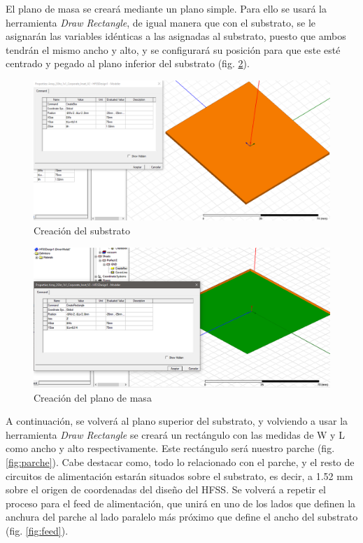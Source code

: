 \par El plano de masa se creará mediante un plano simple. Para ello se usará la herramienta \textit{Draw Rectangle}, de igual manera que con el substrato, se le asignarán las variables idénticas a las asignadas al substrato, puesto que ambos tendrán el mismo ancho y alto, y se configurará su posición para que este esté centrado y pegado al plano inferior del substrato (fig. \ref{fig:masa}).
\\
\begin{figure}[p]
    \centering
        \includegraphics[width=\textwidth]{archivos/desarrollo/1}
        \caption{Creación del substrato}
        \label{fig:substrato}
\end{figure}
\begin{figure}[p]
    \centering
        \includegraphics[width=\textwidth]{archivos/desarrollo/2}
        \caption{Creación del plano de masa}
        \label{fig:masa}
\end{figure}
\par A continuación, se volverá al plano superior del substrato, y volviendo a usar la herramienta \textit{Draw Rectangle} se creará un rectángulo con las medidas de W y L como ancho y alto respectivamente. Este rectángulo será nuestro parche (fig. \ref{fig:parche}). Cabe destacar como, todo lo relacionado con el parche, y el resto de circuitos de alimentación estarán situados sobre el substrato, es decir, a 1.52 mm sobre el origen de coordenadas del diseño del HFSS. Se volverá a repetir el proceso para el feed de alimentación, que unirá en uno de los lados que definen la anchura del parche al lado paralelo más próximo que define el ancho del substrato (fig. \ref{fig:feed}).
